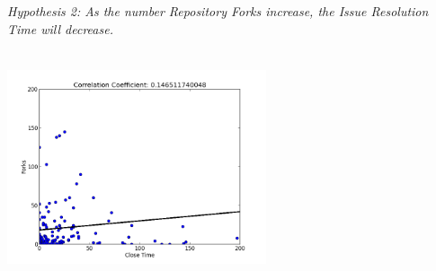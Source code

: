 \documentclass{proc}
\begin{document}
\emph{Hypothesis 2: As the number Repository Forks increase, the Issue Resolution Time will decrease.}\\
\includegraphics[height=3in,width=3in]{images/issue_close_time_forks_scatterplot.png}
\end{document}
